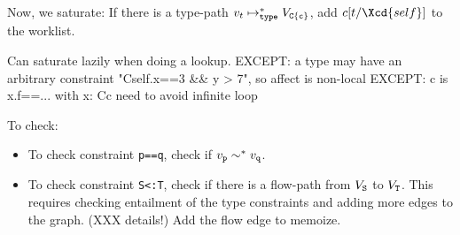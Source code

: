 Now, we saturate: 
If there is a type-path $v_t \mapsto_{\tt type}^* V_{\tt C\{c\}}$,
add $c[t/\Xcd{self}]$ to the worklist.

        Can saturate lazily when doing a lookup.
        EXCEPT: a type may have an arbitrary constraint
                \xcd"C{self.x==3 && y > 7}", so affect is non-local
        EXCEPT: c is x.f==...
                with x: C{c}
                need to avoid infinite loop

To check:

\begin{itemize}
\item To check
constraint {\tt p==q}, check if $v_{\tt p} \sim^* v_{\tt q}$.
\item To check
constraint {\tt S<:T}, check if there is a flow-path from $V_{\tt S}$ to
$V_{\tt T}$.  This requires checking entailment of the type constraints and
adding more edges to the graph.  (XXX details!)
Add the flow edge to memoize.
\end{itemize}


